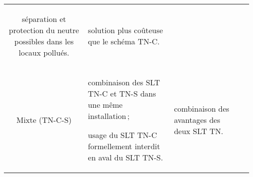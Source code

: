 \begin{xltabular}{\textwidth}{C >{\compress}X >{\compress}X >{\compress}X}
\begin{tabitemize}
\item séparation et protection du neutre possibles dans les locaux pollués.
\end{tabitemize}
&
\begin{tabitemize}
\item solution plus coûteuse que le schéma TN-C.
\end{tabitemize}
\\
\addlinespace
Mixte (TN-C-S)	
&
\begin{tabitemize}
\item combinaison des SLT TN-C et TN-S dans une même installation\,;
\item usage du SLT TN-C formellement interdit en aval du SLT TN-S.
\end{tabitemize}
&
\begin{tabitemize}
\item combinaison des avantages des deux SLT TN.
\end{tabitemize}
&\\
\end{xltabular}


%

